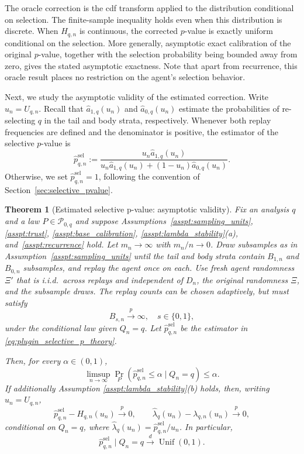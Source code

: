 \documentclass[10pt]{article}
\newtheorem{theorem}{Theorem}
\begin{document}
The oracle correction is the cdf transform applied to the distribution conditional on selection. The finite-sample inequality holds even when this distribution is discrete. When $H_{q,n}$ is continuous, the corrected $p$-value is exactly uniform conditional on the selection. More generally, asymptotic exact calibration of the original $p$-value, together with the selection probability being bounded away from zero, gives the stated asymptotic exactness. Note that apart from recurrence, this oracle result places no restriction on the agent's selection behavior.

Next, we study the asymptotic validity of the estimated correction. Write $u_n=U_{q,n}$. Recall that $\widehat a_{1,q}(u_n)$ and $\widehat a_{0,q}(u_n)$ estimate the probabilities of re-selecting $q$ in the tail and body strata, respectively.
 Whenever both replay frequencies are defined and the denominator is positive, the estimator of the selective $p$-value is
\begin{equation}
\label{eq:plugin_selective_p_theory}
\widehat p_{q,n}^{\mathrm{sel}}
:=
\frac{u_n\widehat a_{1,q}(u_n)}
{u_n\widehat a_{1,q}(u_n)
 +(1-u_n)\widehat a_{0,q}(u_n)}.
\end{equation}
Otherwise, we set $\widehat p_{q,n}^{\mathrm{sel}}=1$, following the convention of Section~\ref{sec:selective_pvalue}.

\begin{theorem}[Estimated selective p-value: asymptotic validity]
\label{thm:asymptotic_validity}
Fix an analysis $q$ and a law $P\in\mathcal P_{0,q}$ and
suppose Assumptions~\ref{asspt:sampling_units},
\ref{asspt:trust}, \ref{asspt:base_calibration},
\ref{asspt:lambda_stability}(a), and~\ref{asspt:recurrence} hold.
Let $m_n\to\infty$ with $m_n/n\to0$. Draw subsamples as in Assumption~\ref{asspt:sampling_units} until the tail and body strata contain $B_{1,n}$ and $B_{0,n}$ subsamples, and replay the agent once on each. Use fresh agent randomness $\Xi'$ that is i.i.d.\ across replays and independent of $D_n$, the original randomness $\Xi$, and the subsample draws.
The replay counts can be chosen adaptively, but must satisfy
\[
B_{s,n}\stackrel{p}{\longrightarrow}\infty,
\quad s\in\{0,1\},
\]
under the conditional law given $Q_n=q$.
Let $\widehat p_{q,n}^{\mathrm{sel}}$ be the estimator in \eqref{eq:plugin_selective_p_theory}.

Then, for every $\alpha\in(0,1)$,
\begin{equation} \label{eq:asympt_validity}
\limsup_{n\to\infty}
\Pr_P\!\left(
\widehat p_{q,n}^{\mathrm{sel}}\le\alpha
\mid Q_n=q
\right)
\le\alpha.
\end{equation}
If additionally Assumption \ref{asspt:lambda_stability}(b) holds, then, writing $u_n=U_{q,n}$,
\begin{equation}\label{eq:oracle_equivalence}
\widehat p_{q,n}^{\mathrm{sel}}-H_{q,n}(u_n)
\stackrel{p}{\longrightarrow}0,
\qquad
\widehat\lambda_q(u_n)-\lambda_{q,n}(u_n)
\stackrel{p}{\longrightarrow}0,
\end{equation}
conditional on $Q_n=q$, where $\widehat \lambda_q(u_n)=\widehat p_{q,n}^{\mathrm{sel}}/u_n$. In particular,
\[
\widehat p_{q,n}^{\mathrm{sel}}\mid Q_n=q
\xrightarrow{d}\operatorname{Unif}(0,1).
\]
\end{theorem}
\end{document}
